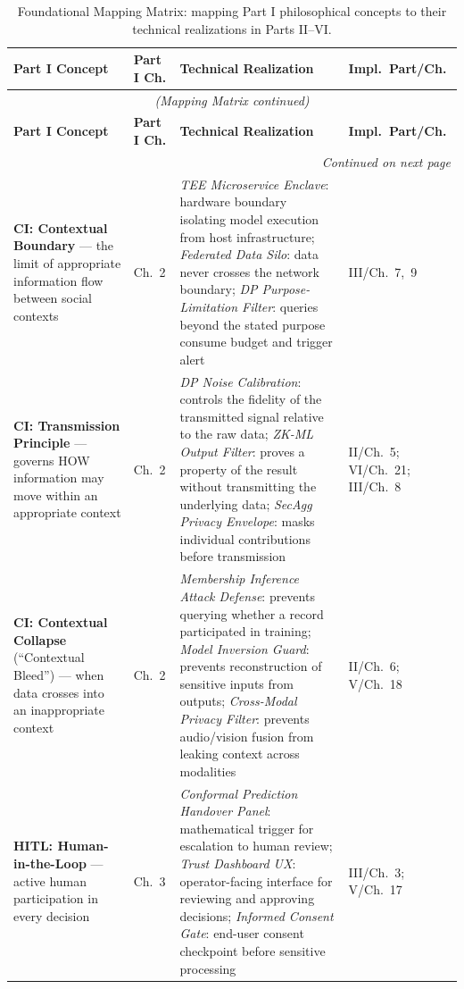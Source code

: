 \begin{longtable}{p{3.5cm} p{1.8cm} p{5.5cm} p{1.5cm}}
\caption{Foundational Mapping Matrix: mapping Part I philosophical concepts to their technical realizations in Parts II--VI.}
\label{tab:mapping_matrix} \\
\toprule
\textbf{Part I Concept} & \textbf{Part I Ch.} & \textbf{Technical Realization} & \textbf{Impl.\ Part/Ch.} \\
\midrule
\endfirsthead
\multicolumn{4}{c}{\textit{(Mapping Matrix continued)}} \\
\toprule
\textbf{Part I Concept} & \textbf{Part I Ch.} & \textbf{Technical Realization} & \textbf{Impl.\ Part/Ch.} \\
\midrule
\endhead
\midrule \multicolumn{4}{r}{\textit{Continued on next page}} \\
\endfoot
\bottomrule
\endlastfoot

\textbf{CI: Contextual Boundary} --- the limit of appropriate information flow between social contexts &
Ch.~2 &
\textit{TEE Microservice Enclave}: hardware boundary isolating model execution from host infrastructure; \textit{Federated Data Silo}: data never crosses the network boundary; \textit{DP Purpose-Limitation Filter}: queries beyond the stated purpose consume budget and trigger alert &
III/Ch.~7,~9 \\[4pt]

\textbf{CI: Transmission Principle} --- governs HOW information may move within an appropriate context &
Ch.~2 &
\textit{DP Noise Calibration}: controls the fidelity of the transmitted signal relative to the raw data; \textit{ZK-ML Output Filter}: proves a property of the result without transmitting the underlying data; \textit{SecAgg Privacy Envelope}: masks individual contributions before transmission &
II/Ch.~5; VI/Ch.~21; III/Ch.~8 \\[4pt]

\textbf{CI: Contextual Collapse} (``Contextual Bleed'') --- when data crosses into an inappropriate context &
Ch.~2 &
\textit{Membership Inference Attack Defense}: prevents querying whether a record participated in training; \textit{Model Inversion Guard}: prevents reconstruction of sensitive inputs from outputs; \textit{Cross-Modal Privacy Filter}: prevents audio/vision fusion from leaking context across modalities &
II/Ch.~6; V/Ch.~18 \\[4pt]

\textbf{HITL: Human-in-the-Loop} --- active human participation in every decision &
Ch.~3 &
\textit{Conformal Prediction Handover Panel}: mathematical trigger for escalation to human review; \textit{Trust Dashboard UX}: operator-facing interface for reviewing and approving decisions; \textit{Informed Consent Gate}: end-user consent checkpoint before sensitive processing &
III/Ch.~3; V/Ch.~17 \\[4pt]


\end{longtable}
